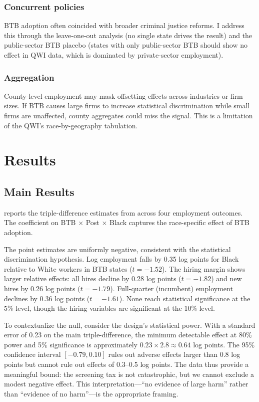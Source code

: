 \documentclass[12pt]{article}
\begin{document}
\subsubsection*{Concurrent policies} BTB adoption often coincided with broader criminal justice reforms. I address this through the leave-one-out analysis (no single state drives the result) and the public-sector BTB placebo (states with only public-sector BTB should show no effect in QWI data, which is dominated by private-sector employment).

\subsubsection*{Aggregation} County-level employment may mask offsetting effects across industries or firm sizes. If BTB causes large firms to increase statistical discrimination while small firms are unaffected, county aggregates could miss the signal. This is a limitation of the QWI's race-by-geography tabulation.


\section{Results}

\subsection{Main Results}

 reports the triple-difference estimates from  across four employment outcomes. The coefficient on BTB $\times$ Post $\times$ Black captures the race-specific effect of BTB adoption.



The point estimates are uniformly negative, consistent with the statistical discrimination hypothesis. Log employment falls by 0.35 log points for Black relative to White workers in BTB states ($t = -1.52$). The hiring margin shows larger relative effects: all hires decline by 0.28 log points ($t = -1.82$) and new hires by 0.26 log points ($t = -1.79$). Full-quarter (incumbent) employment declines by 0.36 log points ($t = -1.61$). None reach statistical significance at the 5\% level, though the hiring variables are significant at the 10\% level.

To contextualize the null, consider the design's statistical power. With a standard error of 0.23 on the main triple-difference, the minimum detectable effect at 80\% power and 5\% significance is approximately $0.23 \times 2.8 \approx 0.64$ log points. The 95\% confidence interval $[-0.79, 0.10]$ rules out adverse effects larger than 0.8 log points but cannot rule out effects of 0.3--0.5 log points. The data thus provide a meaningful bound: the screening tax is not catastrophic, but we cannot exclude a modest negative effect. This interpretation---``no evidence of large harm'' rather than ``evidence of no harm''---is the appropriate framing.
\end{document}
